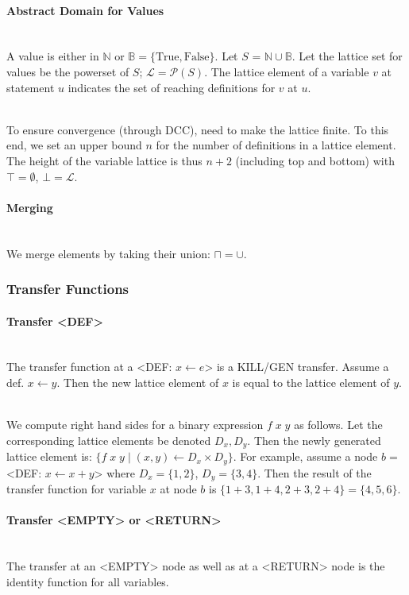 \documentclass[a4paper]{article}
\newcommand{\NL}[0]{ \hfill\\\noindent }
\begin{document}
\paragraph{Abstract Domain for Values}\NL
A value is either in $\mathbb{N}$ or $\mathbb{B} = \{\text{True}, \text{False}\}$. Let $S$ = $\mathbb{N} \cup \mathbb{B}$. Let the lattice set for values be the powerset of $S$; $\mathcal{L} = \mathcal{P}(S)$. The lattice element of a variable $v$ at statement $u$ indicates the set of reaching definitions for $v$ at $u$. 

\NL
To ensure convergence (through DCC), need to make the lattice finite. To this end, we set an upper bound $n$ for the number of definitions in a lattice element. The height of the variable lattice is thus $n + 2$ (including top and bottom) with $\top = \emptyset$, $\bot = \mathcal{L}$.



\paragraph{Merging}\NL
We merge elements by taking their union: $\sqcap = \cup$. 

\subsubsection{Transfer Functions}
\paragraph{Transfer <DEF>}\NL
The transfer function at a <DEF: $x \leftarrow e$> is a KILL/GEN transfer. Assume a def. $x \leftarrow y$. Then the new lattice element of $x$ is equal to the lattice element of $y$.

\NL
We compute right hand sides for a binary expression $f\;x\;y$ as follows. Let the corresponding lattice elements be denoted $D_x, D_y$. Then the newly generated lattice element is:
$\{ f\;x\;y \;|\; (x,y) \leftarrow D_x \times D_y \}$. For example, assume a node $b = $ <DEF: $x \leftarrow x + y$> where $D_x = \{1,2\}$, $D_y = \{3,4\}$. Then the result of the transfer function for variable $x$ at node $b$ is $\{1 + 3, 1 + 4, 2 + 3, 2 + 4\} = \{4,5,6\}$.

\paragraph{Transfer <EMPTY> or <RETURN>}\NL
The transfer at an <EMPTY> node as well as at a <RETURN> node is the identity function for all variables.
\end{document}
